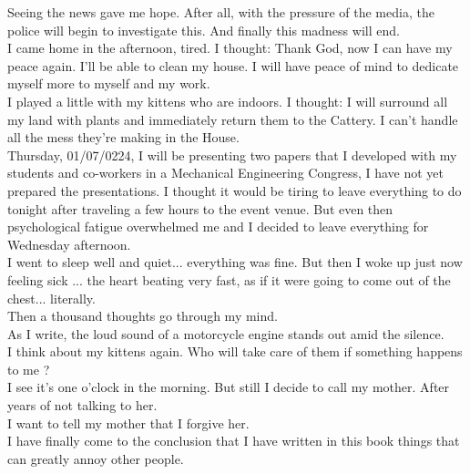 \documentclass[11pt]{book}
\begin{document}
\noindent Seeing the news gave me hope. After all, with the pressure of the media, the police will begin to investigate this. And finally this madness will end. \\

\noindent I came home in the afternoon, tired. I thought: Thank God, now I can have my peace again. I'll be able to clean my house. I will have peace of mind to dedicate myself more to myself and my work. \\

\noindent I played a little with my kittens who are indoors. I thought: I will surround all my land with plants and immediately return them to the Cattery. I can't handle all the mess they're making in the House. \\

\noindent Thursday, 01/07/0224, I will be presenting two papers that I developed with my students and co-workers in a Mechanical Engineering Congress, I have not yet prepared the presentations. I thought it would be tiring to leave everything to do tonight after traveling a few hours to the event venue. But even then psychological fatigue overwhelmed me and I decided to leave everything for Wednesday afternoon. \\

\noindent I went to sleep well and quiet... everything was fine. But then I woke up just now feeling sick ... the heart beating very fast, as if it were going to come out of the chest... literally. \\

\noindent Then a thousand thoughts go through my mind. \\

\noindent As I write, the loud sound of a motorcycle engine stands out amid the silence. \\

\noindent I think about my kittens again. Who will take care of them if something happens to me ? \\

\noindent I see it's one o'clock in the morning. But still I decide to call my mother. After years of not talking to her. \\ 

\noindent I want to tell my mother that I forgive her. \\

\noindent I have finally come to the conclusion that I have written in this book things that can greatly annoy other people. \\
\end{document}
